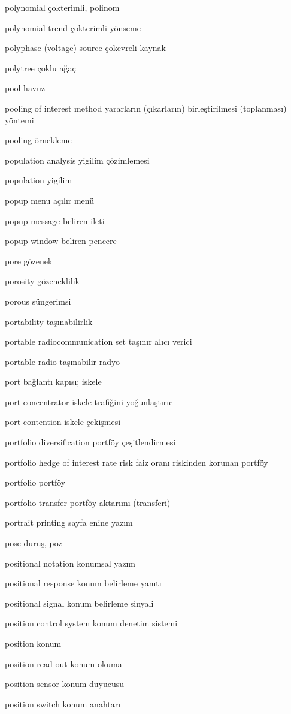 \documentclass[12pt,fleqn]{article}\usepackage{../../common}
\begin{document}
polynomial çokterimli, polinom

polynomial trend çokterimli yönseme

polyphase (voltage) source çokevreli kaynak

polytree çoklu ağaç

pool havuz

pooling of interest method yararların (çıkarların) birleştirilmesi (toplanması) yöntemi

pooling örnekleme

population analysis yigilim çözimlemesi

population yigilim

popup menu açılır menü

popup message beliren ileti

popup window beliren pencere

pore gözenek

porosity gözeneklilik

porous süngerimsi

portability taşınabilirlik

portable radiocommunication set taşınır alıcı verici

portable radio taşınabilir radyo

port bağlantı kapısı; iskele

port concentrator iskele trafiğini yoğunlaştırıcı

port contention iskele çekişmesi

portfolio diversification  portföy çeşitlendirmesi

portfolio hedge of interest rate risk faiz oranı riskinden korunan portföy

portfolio portföy

portfolio transfer portföy aktarımı (transferi)

portrait printing sayfa enine yazım

pose duruş, poz

positional notation konumsal yazım

positional response konum belirleme yanıtı

positional signal konum belirleme sinyali

position control system konum denetim sistemi

position konum

position read out konum okuma

position sensor konum duyucusu

position switch konum anahtarı
\end{document}
